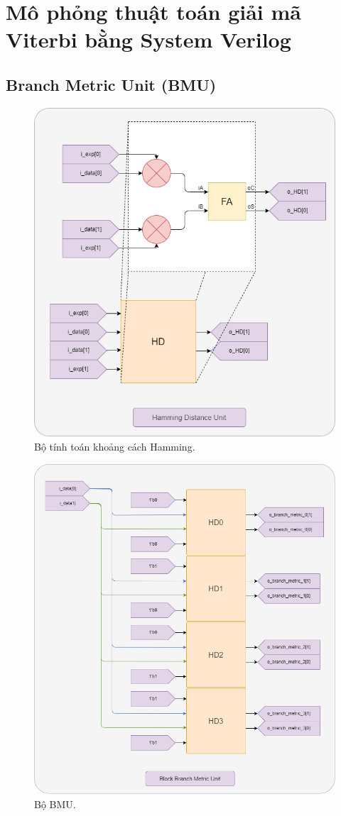 \section{Mô phỏng thuật toán giải mã Viterbi bằng System Verilog}

\subsection{Branch Metric Unit (BMU)}

\begin{figure}[H]
	\centering
	\includegraphics[width=.8\linewidth]{sections/pic/mophongbangSystemVerilog/HD_unit.png}
	\caption{Bộ tính toán khoảng cách Hamming.}
\end{figure}

\begin{figure}[H]
	\centering
	\includegraphics[width=.8\linewidth]{sections/pic/mophongbangSystemVerilog/BM_unit.png}
	\caption{Bộ BMU.}
\end{figure}

